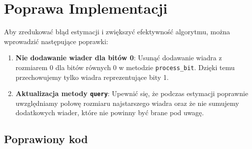 \documentclass{article}
\begin{document}
\section{Poprawa Implementacji}

Aby zredukować błąd estymacji i zwiększyć efektywność algorytmu, można wprowadzić następujące poprawki:

\begin{enumerate}
    \item \textbf{Nie dodawanie wiader dla bitów 0}: Usunąć dodawanie wiadra z rozmiarem 0 dla bitów równych 0 w metodzie \texttt{process\_bit}. Dzięki temu przechowujemy tylko wiadra reprezentujące bity 1.
    \item \textbf{Aktualizacja metody \texttt{query}}: Upewnić się, że podczas estymacji poprawnie uwzględniamy połowę rozmiaru najstarszego wiadra oraz że nie sumujemy dodatkowych wiader, które nie powinny być brane pod uwagę.
\end{enumerate}

\newpage

\subsection{Poprawiony kod}
\end{document}
